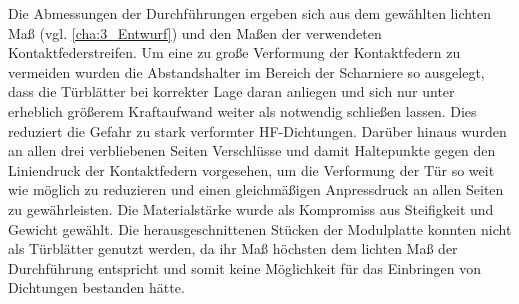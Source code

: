 


Die Abmessungen der Durchführungen ergeben sich aus dem gewählten lichten Maß (vgl. \Abschnitt\ref{cha:3_Entwurf}) und den Maßen der verwendeten Kontaktfederstreifen. Um eine zu große Verformung der Kontaktfedern zu vermeiden wurden die Abstandshalter im Bereich der Scharniere so ausgelegt, dass die Türblätter bei korrekter Lage daran anliegen und sich nur unter erheblich größerem Kraftaufwand weiter als notwendig schließen lassen. Dies reduziert die Gefahr zu stark verformter HF-Dichtungen. Darüber hinaus wurden an allen drei verbliebenen Seiten Verschlüsse und damit Haltepunkte gegen den Liniendruck der Kontaktfedern vorgesehen, um die Verformung der Tür so weit wie möglich zu reduzieren und einen gleichmäßigen Anpressdruck an allen Seiten zu gewährleisten. Die Materialstärke wurde als Kompromiss aus Steifigkeit und Gewicht gewählt. Die herausgeschnittenen Stücken der Modulplatte konnten nicht als Türblätter genutzt werden, da ihr Maß höchsten dem lichten Maß der Durchführung entspricht und somit keine Möglichkeit für das Einbringen von Dichtungen bestanden hätte.
\par
\vspace{\linespace}



